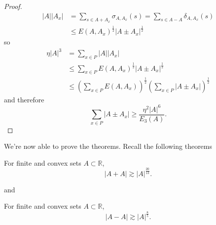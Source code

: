 \documentclass[12pt,reqno]{amsart}
\begin{document}
\begin{proof}
\begin{align*}
\left\lvert A \right\rvert \left\lvert A_{x}  \right\rvert & = \sum _{s \in A + A_{x} } \sigma_{A, A_{x} } (s) = \sum _{s \in A-A} \delta_{A, A_{x} } (s)\\
& \leq E\left( A, A_{x}  \right) ^{\frac{1}{2} } \left\lvert A \pm  A_{x}  \right\rvert ^{\frac{1}{2} }
\end{align*}
so
\begin{align*}
\eta \left\lvert A \right\rvert ^{3} & =  \sum _{x \in P} \left\lvert A \right\rvert \left\lvert A_{x}  \right\rvert \\
& \leq \sum _{x \in P} E(A, A_{x} )^{\frac{1}{2} }\left\lvert A \pm A_{x}  \right\rvert ^{\frac{1}{2} } \\
& \leq \left( \sum _{x\in P} E(A,A_{x} ) \right)  ^{\frac{1}{2} } \left( \sum _{x \in P} \left\lvert A \pm A_{x}  \right\rvert  \right) ^{\frac{1}{2} }
\end{align*}
and therefore
\[
    \sum _{x \in P} \left\lvert A \pm A_{x}  \right\rvert \geq \frac{\eta ^{2}\left\lvert A \right\rvert ^{6}}{E_{3} (A)} 
.\]

\end{proof}

We're now able to prove the theorems. Recall the following theorems

\begin{theorem*}
For finite and convex sets \(A \subset \mathbb{R} \),
\[
    \left\lvert A + A \right\rvert \gtrsim  \left\lvert A \right\rvert ^{\frac{20}{13}  }
.\]
\end{theorem*}
and
\begin{theorem*}
For finite and convex sets \(A \subset \mathbb{R} \),
\[
    \left\lvert A - A \right\rvert \gtrsim \left\lvert A \right\rvert ^{\frac{8}{5} }
.\]
\end{theorem*}
\end{document}
